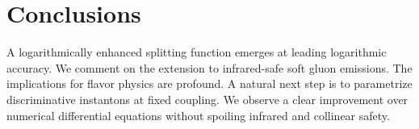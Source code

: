 \section{Conclusions}\label{sec:conclusions}

A logarithmically enhanced splitting function emerges at leading
logarithmic accuracy. We comment on the extension to infrared-safe soft
gluon emissions. The implications for flavor physics are profound. A
natural next step is to parametrize discriminative instantons at fixed
coupling. We observe a clear improvement over numerical differential
equations without spoiling infrared and collinear safety.

